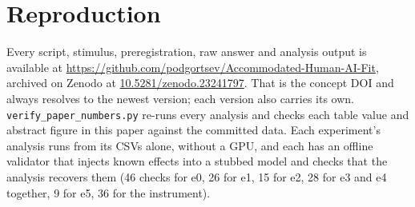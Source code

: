 \documentclass[11pt]{article}
\begin{document}
\section{Reproduction}
\label{sec:repro}

Every script, stimulus, preregistration, raw answer and analysis output is
available at \url{https://github.com/podgortsev/Accommodated-Human-AI-Fit},
archived on Zenodo at
\href{https://doi.org/10.5281/zenodo.23241797}{10.5281/zenodo.23241797}. That is
the concept DOI and always resolves to the newest version; each version also
carries its own. \texttt{verify\_paper\_numbers.py} re-runs every analysis and
checks each table value and abstract figure in this paper against the committed
data. Each experiment's analysis runs from its CSVs alone, without a GPU,
and each has an offline validator that injects known effects into a stubbed model
and checks that the analysis recovers them (46 checks for e0, 26 for e1, 15 for e2,
28 for e3 and e4 together, 9 for e5, 36 for the instrument).
\end{document}
